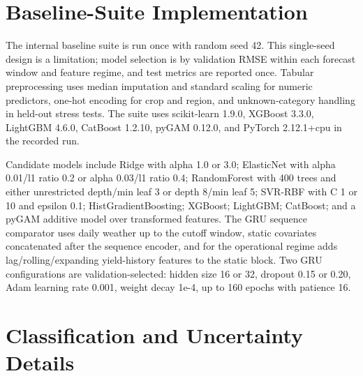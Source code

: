 \documentclass[wcp]{jmlr}
\begin{document}
\section{Baseline-Suite Implementation}

The internal baseline suite is run once with random seed 42. This single-seed design is a limitation; model selection is by validation RMSE within each forecast window and feature regime, and test metrics are reported once. Tabular preprocessing uses median imputation and standard scaling for numeric predictors, one-hot encoding for crop and region, and unknown-category handling in held-out stress tests. The suite uses scikit-learn 1.9.0, XGBoost 3.3.0, LightGBM 4.6.0, CatBoost 1.2.10, pyGAM 0.12.0, and PyTorch 2.12.1+cpu in the recorded run.

Candidate models include Ridge with alpha 1.0 or 3.0; ElasticNet with alpha 0.01/l1 ratio 0.2 or alpha 0.03/l1 ratio 0.4; RandomForest with 400 trees and either unrestricted depth/min leaf 3 or depth 8/min leaf 5; SVR-RBF with C 1 or 10 and epsilon 0.1; HistGradientBoosting; XGBoost; LightGBM; CatBoost; and a pyGAM additive model over transformed features. The GRU sequence comparator uses daily weather up to the cutoff window, static covariates concatenated after the sequence encoder, and for the operational regime adds lag/rolling/expanding yield-history features to the static block. Two GRU configurations are validation-selected: hidden size 16 or 32, dropout 0.15 or 0.20, Adam learning rate 0.001, weight decay 1e-4, up to 160 epochs with patience 16.

\section{Classification and Uncertainty Details}

\begin{table}[H]
\centering
\caption{Sensitivity of the low-yield-risk label to crop-specific training shortfall percentiles. The 80th percentile is the main setting.}

\end{table}

\begin{table}[H]
\centering
\caption{Best threshold-tuned classification metrics by forecast window. Pred.+ is the fraction of test examples flagged positive by the selected threshold.}
\resizebox{\textwidth}{!}{}
\end{table}
\end{document}

